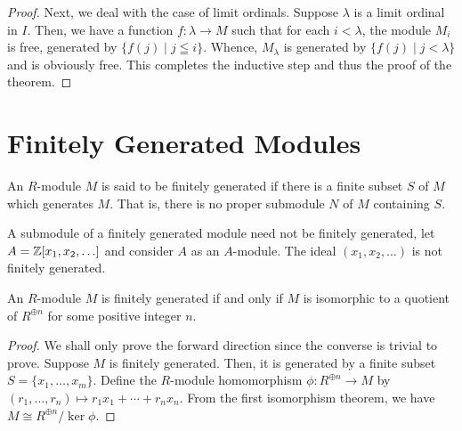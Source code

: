 \begin{proof}
    Next, we deal with the case of limit ordinals. Suppose $\lambda$ is a limit ordinal in $I$. Then, we have a function $f:\lambda\to M$ such that for each $i < \lambda$, the module $M_i$ is free, generated by $\{f(j)\mid j\leqq i\}$. Whence, $M_\lambda$ is generated by $\{f(j)\mid j < \lambda\}$ and is obviously free. This completes the inductive step and thus the proof of the theorem.
\end{proof}

\section{Finitely Generated Modules}

\begin{definition}
    An $R$-module $M$ is said to be finitely generated if there is a finite subset $S$ of $M$ which generates $M$. That is, there is no proper submodule $N$ of $M$ containing $S$.
\end{definition}

A submodule of a finitely generated module need not be finitely generated, let $A = \mathbb{Z}[x_1,x_2,\ldots]$ and consider $A$ as an $A$-module. The ideal $(x_1,x_2,\ldots)$ is not finitely generated.

\begin{proposition}
    An $R$-module $M$ is finitely generated if and only if $M$ is isomorphic to a quotient of $R^{\oplus n}$ for some positive integer $n$.
\end{proposition}
\begin{proof}
    We shall only prove the forward direction since the converse is trivial to prove. Suppose $M$ is finitely generated. Then, it is generated by a finite subset $S = \{x_1,\ldots,x_m\}$. Define the $R$-module homomorphism $\phi:R^{\oplus n}\to M$ by $(r_1,\ldots,r_n)\mapsto r_1x_1 + \cdots + r_nx_n$. From the first isomorphism theorem, we have $M\cong R^{\oplus n}/\ker\phi$.
\end{proof}

